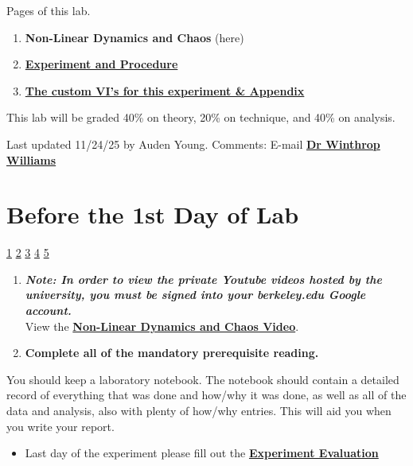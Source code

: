 \documentclass{../lab}
\begin{document}
Pages of this lab.

\begin{enumerate}
    \item \textbf{Non-Linear Dynamics and Chaos} (here)

    \item \href{https://berkeley-physics111b.github.io/appendices/NLD-Experiment-and-Procedure/}{\textbf{Experiment and Procedure}}
    
    \item \href{https://berkeley-physics111b.github.io/appendices/NLD-The-custom-VI-s-for-this-experiment-and-Appendix/}{\textbf{The custom VI's for this experiment \& Appendix}}
\end{enumerate}

This lab will be graded 40\% on theory, 20\% on technique, and 40\% on analysis.

Last updated 11/24/25 by Auden Young. Comments: E-mail \href{\MailLabManager}{\textbf{Dr Winthrop Williams}}

\section{Before the 1st Day of Lab}

\signatures \hyperlink{DFT Window Units}{1} \hyperlink{Cob Web Program}{2} \hyperlink{Liapunov Exponent Program}{3} \hyperlink{Henon Map}{4} \hyperlink{Bouncing Ball and PN-Junction Circuits}{5} 

\begin{enumerate}
    \item \emph{\textbf{Note: In order to view the private Youtube videos hosted by the university, you must be signed into your berkeley.edu Google account.}}\\
    View the \href{http://www.youtube.com/watch?v=Y0u3o9\_BRVQ}{\textbf{Non-Linear Dynamics and Chaos Video}}.

    \item \textbf{Complete all of the mandatory prerequisite reading.}

\end{enumerate}

You should keep a laboratory notebook. The notebook should contain a detailed record of everything that was done and how/why it was done, as well as all of the data and analysis, also with plenty of how/why entries. This will aid you when you write your report.

\begin{itemize}
    \item Last day of the experiment please fill out the \href{\ExperimentEvaluation}{\textbf{Experiment Evaluation}}
\end{itemize}
\end{document}
